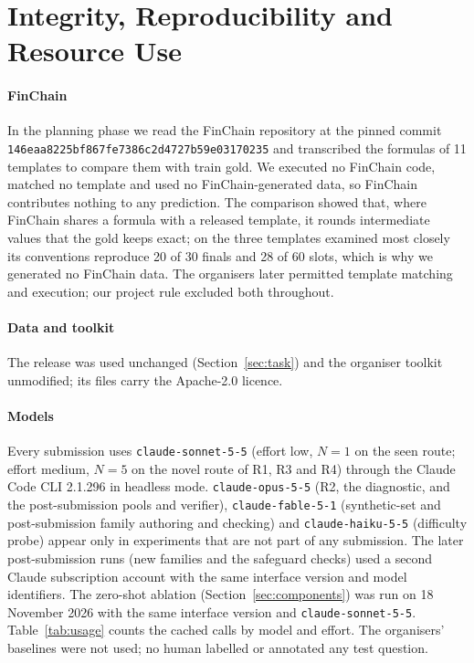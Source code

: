 \documentclass[conference]{IEEEtran}
\newcommand{\id}[1]{\texttt{#1}}
\begin{document}
\section{Integrity, Reproducibility and Resource Use}\label{sec:integrity}


\paragraph*{FinChain}
In the planning phase we read the FinChain repository at the pinned commit \id{146eaa8225bf867fe7386c2d4727b59e03170235} and transcribed the formulas of 11 templates to compare them with train gold. We executed no FinChain code, matched no template and used no FinChain-generated data, so FinChain contributes nothing to any prediction. The comparison showed that, where FinChain shares a formula with a released template, it rounds intermediate values that the gold keeps exact; on the three templates examined most closely its conventions reproduce 20 of 30 finals and 28 of 60 slots, which is why we generated no FinChain data. The organisers later permitted template matching and execution; our project rule excluded both throughout.

\paragraph*{Data and toolkit}
The release was used unchanged (Section~\ref{sec:task}) and the organiser toolkit unmodified; its files carry the Apache-2.0 licence.

\paragraph*{Models}
Every submission uses \id{claude-sonnet-5-5} (effort low, $N=1$ on the seen route; effort medium, $N=5$ on the novel route of R1, R3 and R4) through the Claude Code CLI 2.1.296 in headless mode. \id{claude-opus-5-5} (R2, the diagnostic, and the post-submission pools and verifier), \id{claude-fable-5-1} (synthetic-set and post-submission family authoring and checking) and \id{claude-haiku-5-5} (difficulty probe) appear only in experiments that are not part of any submission. The later post-submission runs (new families and the safeguard checks) used a second Claude subscription account with the same interface version and model identifiers. The zero-shot ablation (Section~\ref{sec:components}) was run on 18 November 2026 with the same interface version and \id{claude-sonnet-5-5}. Table~\ref{tab:usage} counts the cached calls by model and effort. The organisers' baselines were not used; no human labelled or annotated any test question.
\end{document}
